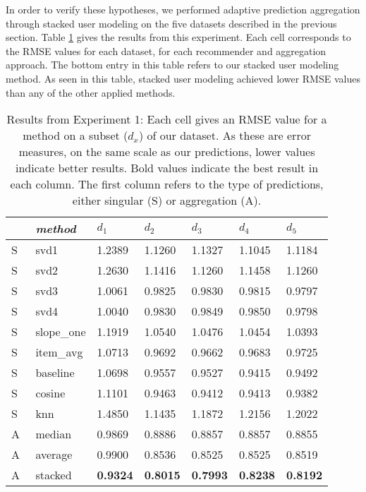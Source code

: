In order to verify these hypotheses, we performed adaptive prediction aggregation
through stacked user modeling on the five datasets described in the previous section.
Table \ref{table:results:e1} gives the results from this experiment.
Each cell corresponds to the RMSE values for each dataset,
for each recommender and aggregation approach.
The bottom entry in this table refers to our stacked user modeling method.
As seen in this table, stacked user modeling achieved
lower RMSE values than any of the other applied methods.

\begin{table}
  \begin{tabular*}{\textwidth}{ l p{3cm} p{1.5cm} p{1.5cm} p{1.5cm} p{1.5cm} p{1.5cm} }
    \toprule
      ~ & \emph{method} & 
      $d_1$ & $d_2$ & $d_3$ & $d_4$ & $d_5$ \\ 
    \midrule
    S & svd1          & 1.2389	  & 1.1260	  & 1.1327	  & 1.1045	  & 1.1184	 \\
    S & svd2          & 1.2630	  & 1.1416    & 1.1260	  & 1.1458	  & 1.1260	 \\
    S & svd3          & 1.0061	  & 0.9825	  & 0.9830	  & 0.9815	  & 0.9797	 \\
    S & svd4          & 1.0040	  & 0.9830	  & 0.9849	  & 0.9850	  & 0.9798	 \\
    S & slope\_one    & 1.1919	  & 1.0540	  & 1.0476	  & 1.0454	  & 1.0393   \\
    S & item\_avg     & 1.0713	  & 0.9692	  & 0.9662	  & 0.9683	  & 0.9725	 \\
    S & baseline       & 1.0698	  & 0.9557	  & 0.9527	  & 0.9415	  & 0.9492	 \\
    S & cosine   	    & 1.1101	  & 0.9463	  & 0.9412	  & 0.9413	  & 0.9382	 \\
    S & knn       	  & 1.4850	  & 1.1435	  & 1.1872    & 1.2156	  & 1.2022	 \\
    \midrule                                                                    
    A & median    	  & 0.9869	  & 0.8886	  & 0.8857    & 0.8857	  & 0.8855	 \\
    A & average    	  & 0.9900	  & 0.8536	  & 0.8525	  & 0.8525	  & 0.8519	 \\
    A & stacked       & \textbf{0.9324}	  & \textbf{0.8015}	  & \textbf{0.7993}  & \textbf{0.8238} & \textbf{0.8192} \\
    \bottomrule
  \end{tabular*}
  \caption[Results from Experiment 1]{
    Results from Experiment 1:
    Each cell gives an RMSE value for a method on a subset ($d_x$) of our dataset.
    As these are error measures, on the same scale as our predictions,
    lower values indicate better results. Bold values indicate the best result in each column.
    The first column refers to the type of predictions, either singular (S) or aggregation (A).}
  \label{table:results:e1}
\end{table}

